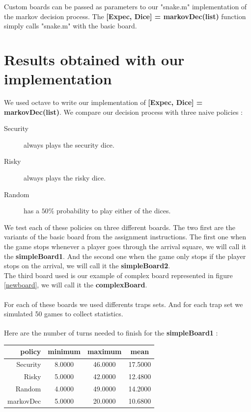 \documentclass{eplDoc}
\begin{document}
Custom boards can be passed as parameters to our "snake.m" implementation of the markov decision process. The \textbf{[Expec, Dice] = markovDec(list)} function simply calls "snake.m" with the basic board. 

\section{Results obtained with our implementation}

We used octave to write our implementation of \textbf{[Expec, Dice] = markovDec(list)}. We compare our decision process with three naive policies :
 
\begin{description}
	\item[Security] always plays the security dice.
	\item[Risky] always plays the risky dice.
	\item[Random] has a $50\%$ probability to play either of the dices.
\end{description}
 
We test each of these policies on three different boards. The two first are the variants of the basic board from the assignment instructions. The first one when the game stops whenever a player goes through the arrival square, we will call it the \textbf{simpleBoard1}. And the second one when the game only stops if the player stops on the arrival, we will call it the \textbf{simpleBoard2}. \\ 
The third board used is our example of complex board represented in figure \ref{newboard}, we will call it the \textbf{complexBoard}. \\ \\ 
For each of these boards we used differents traps sets. And for each trap set we simulated 50 games to collect statistics. \\ \\ 

Here are the number of turns needed to finish for the \textbf{simpleBoard1} : 


\begin{center}
		\begin{tabular}{|r|ccc|}
			\hline
			policy & minimum & maximum & mean \\ 
			\hline
			 Security & 8.0000 &  46.0000 &  17.5000 \\
     	Risky & 5.0000  & 42.0000  & 12.4800 \\ 
    	Random & 4.0000 &  49.0000  & 14.2000 \\ 
   		markovDec & 5.0000 &  20.0000 &  10.6800 \\ 
   		\hline
		\end{tabular}
\end{center}
\end{document}
